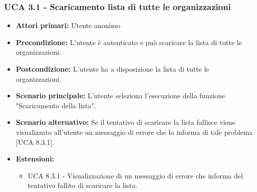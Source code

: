 \subsubsection{UCA 3.1 - Scaricamento lista di tutte le organizzazioni}%
\begin{itemize}
\item \textbf{Attori primari:} Utente anonimo
\item \textbf{Precondizione:} L'utente è autenticato e può scaricare la lista di tutte le organizzazioni.
\item \textbf{Postcondizione:} L'utente ha a disposizione la lista di tutte le organizzazioni.
\item \textbf{Scenario principale:} L'utente seleziona l'esecuzione della funzione "Scaricamento della lista".
\item \textbf{Scenario alternativo:} Se il tentativo di scaricare la lista fallisce viene visualizzato all'utente un messaggio di errore che lo informa di tale problema [UCA 8.3.1].
\item \textbf{Estensioni:}
	\begin{itemize}
	\item UCA 8.3.1 - Visualizzazione di un messaggio di errore che informa del tentativo fallito di scaricare la lista.
\end{itemize}
  
\end{itemize}

